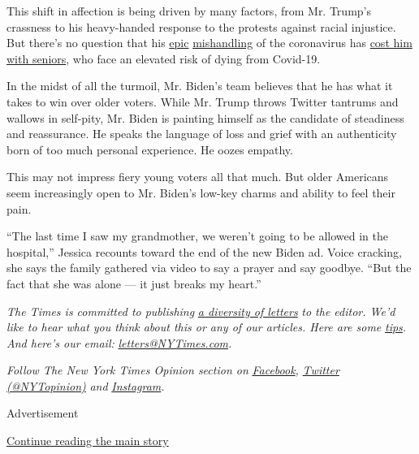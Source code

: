 This shift in affection is being driven by many factors, from Mr.
Trump's crassness to his heavy-handed response to the protests against
racial injustice. But there's no question that his
\href{https://www.nytimes3xbfgragh.onion/2020/07/18/us/politics/trump-coronavirus-response-failure-leadership.html}{epic}
\href{https://www.nytimes3xbfgragh.onion/2020/04/11/us/politics/coronavirus-trump-response.html}{mishandling}
of the coronavirus has
\href{https://www.nytimes3xbfgragh.onion/2020/05/09/us/politics/trump-older-voters-2020.html?action=click\&module=RelatedLinks\&pgtype=Article}{cost
him with seniors}, who face an elevated risk of dying from Covid-19.

In the midst of all the turmoil, Mr. Biden's team believes that he has
what it takes to win over older voters. While Mr. Trump throws Twitter
tantrums and wallows in self-pity, Mr. Biden is painting himself as the
candidate of steadiness and reassurance. He speaks the language of loss
and grief with an authenticity born of too much personal experience. He
oozes empathy.

This may not impress fiery young voters all that much. But older
Americans seem increasingly open to Mr. Biden's low-key charms and
ability to feel their pain.

``The last time I saw my grandmother, we weren't going to be allowed in
the hospital,'' Jessica recounts toward the end of the new Biden ad.
Voice cracking, she says the family gathered via video to say a prayer
and say goodbye. ``But the fact that she was alone --- it just breaks my
heart.''

\emph{The Times is committed to publishing}
\href{https://www.nytimes3xbfgragh.onion/2019/01/31/opinion/letters/letters-to-editor-new-york-times-women.html}{\emph{a
diversity of letters}} \emph{to the editor. We'd like to hear what you
think about this or any of our articles. Here are some}
\href{https://help.nytimes3xbfgragh.onion/hc/en-us/articles/115014925288-How-to-submit-a-letter-to-the-editor}{\emph{tips}}\emph{.
And here's our email:}
\href{mailto:letters@NYTimes.com}{\emph{letters@NYTimes.com}}\emph{.}

\emph{Follow The New York Times Opinion section on}
\href{https://www.facebookcorewwwi.onion/nytopinion}{\emph{Facebook}}\emph{,}
\href{http://twitter.com/NYTOpinion}{\emph{Twitter (@NYTopinion)}}
\emph{and}
\href{https://www.instagram.com/nytopinion/}{\emph{Instagram}}\emph{.}

Advertisement

\protect\hyperlink{after-bottom}{Continue reading the main story}

